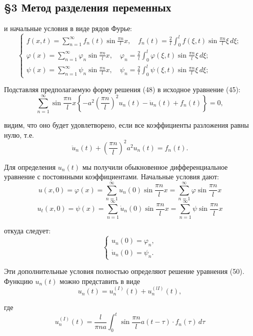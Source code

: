 \documentclass[a4paper, 12pt]{article}
\begin{document}
\begin{center}
\section*{\S3 \qquad Метод разделения переменных}
\end{center}
и начальные условия в виде рядов Фурье:
\[ 
\begin{cases}
f(x, t) = \sum_{n=1}^\infty f_n(t) \sin \frac{\pi n}{l} x, \quad f_n(t) = \frac{2}{l} \int_0^l f(\xi, t) \sin \frac{\pi n}{l} \xi \, d\xi; \\
\varphi(x) = \sum_{n=1}^\infty \varphi_n \sin \frac{\pi n}{l} x, \quad \varphi_n = \frac{2}{l} \int_0^l \varphi(\xi, t) \sin \frac{\pi n}{l} \xi \, d\xi; \\
\psi(x) = \sum_{n=1}^\infty \psi_n \sin \frac{\pi n}{l} x, \quad \psi_n = \frac{2}{l} \int_0^l \psi(\xi, t) \sin \frac{\pi n}{l} \xi \, d\xi; 
\end{cases} \tag{49}
\]

Подставляя предполагаемую форму решения (48) в исходное уравнение (45):
\[ \sum_{n=1}^\infty \sin \frac{\pi n}{l} x \left\{ -a^2 \left( \frac{\pi n}{l} \right)^2 u_n(t) - \ddot{u}_n(t) + f_n(t) \right\} = 0, \]

видим, что оно будет удовлетворено, если все коэффициенты разложения равны нулю, т.е.
\[ \ddot{u}_n(t) + \left( \frac{\pi n}{l} \right)^2 a^2 u_n(t) = f_n(t). \tag{50}\]

Для определения \(u_n(t)\) мы получили обыкновенное дифференциальное уравнение с постоянными коэффициентами. Начальные условия дают:
\[ u(x, 0) = \varphi(x) = \sum_{n=1}^\infty u_n(0) \sin \frac{\pi n}{l} x = \sum_{n=1}^\infty \varphi \sin \frac{\pi n}{l} x \]
\[ u_t(x, 0) = \psi(x) = \sum_{n=1}^\infty \dot{u}_n(0) \sin \frac{\pi n}{l} x = \sum_{n=1}^\infty \psi \sin \frac{\pi n}{l} x \]

откуда следует:
\[
\begin{cases} 
u_n(0) = \varphi_n, \\ 
\dot{u}_n(0) = \psi_n. 
\end{cases} \tag{51}
\]

Эти дополнительные условия полностью определяют решение уравнения (50). Функцию \(u_n(t)\) можно представить в виде
\[ u_n(t) = u_n^{(I)}(t) + u_n^{(lI)}(t), \]

где 
\[ u_n^{(I)}(t) = \frac{l}{\pi n a} \int_0^t \sin \frac{\pi n}{l} a(t - \tau) \cdot f_n(\tau) \, d\tau \tag{52} \]

\newpage
\end{document}
